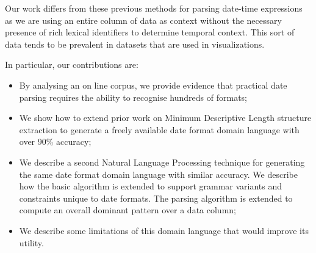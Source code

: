 Our work differs from these previous methods for parsing date-time expressions as we are using an entire column of data as context without the necessary presence of rich lexical identifiers to determine temporal context. This sort of data tends to be prevalent in datasets that are used in visualizations. 

In particular, our contributions are:
\begin{itemize}
\item By analysing an on line corpus, we provide evidence that practical date parsing requires the ability to recognise hundreds of formats;
\item We show how to extend prior work on Minimum Descriptive Length structure extraction to generate a freely available date format domain language with over 90\% accuracy;
\item We describe a second Natural Language Processing technique for generating the same date format domain language with similar accuracy. We describe how the basic algorithm is extended to support grammar variants and constraints unique to date formats. The parsing algorithm is extended to compute an overall dominant pattern over a data column;
\item We describe some limitations of this domain language that would improve its utility.
\end{itemize}
